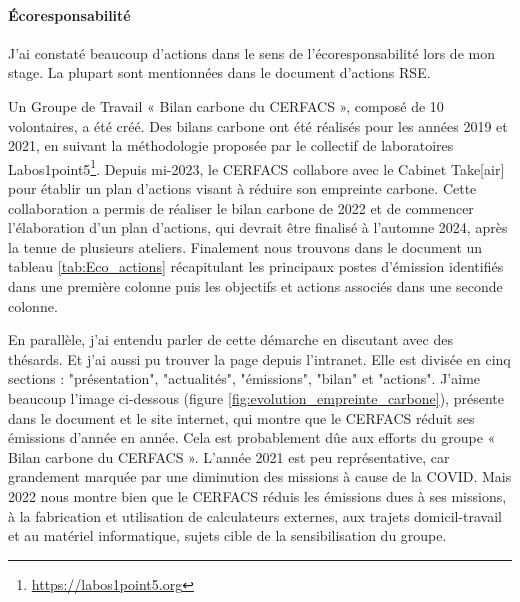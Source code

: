 \paragraph{Écoresponsabilité}
\hspace{0,5cm}

    J'ai constaté beaucoup d'actions dans le sens de l'écoresponsabilité lors de mon stage. La plupart sont mentionnées dans le document d'actions RSE.
    \vspace{0,5cm}

    Un Groupe de Travail « Bilan carbone du CERFACS », composé de 10 volontaires, a été créé. Des bilans carbone ont été réalisés pour les années 2019 et 2021, en suivant la méthodologie proposée par le collectif de laboratoires Labos1point5\footnote{\url{https://labos1point5.org}}. Depuis mi-2023, le CERFACS collabore avec le Cabinet Take[air] pour établir un plan d’actions visant à réduire son empreinte carbone. Cette collaboration a permis de réaliser le bilan carbone de 2022 et de commencer l'élaboration d'un plan d'actions, qui devrait être finalisé à l’automne 2024, après la tenue de plusieurs ateliers. Finalement nous trouvons dans le document un tableau \ref{tab:Eco_actions} récapitulant les principaux postes d'émission identifiés dans une première colonne puis les objectifs et actions associés dans une seconde colonne.

    En parallèle, j'ai entendu parler de cette démarche en discutant avec des thésards. Et j'ai aussi pu trouver la page depuis l'intranet. Elle est divisée en cinq sections : "présentation", "actualités", "émissions", "bilan" et "actions".
    J'aime beaucoup l'image ci-dessous (figure \ref{fig:evolution_empreinte_carbone}), présente dans le document et le site internet, qui montre que le CERFACS réduit ses émissions d'année en année. Cela est probablement dûe aux efforts du groupe « Bilan carbone du CERFACS ». L'année 2021 est peu représentative, car grandement marquée par une diminution des missions à cause de la COVID. Mais 2022 nous montre bien que le CERFACS réduis les émissions dues à ses missions, à la fabrication et utilisation de calculateurs externes, aux trajets domicil-travail et au matériel informatique, sujets cible de la sensibilisation du groupe.


